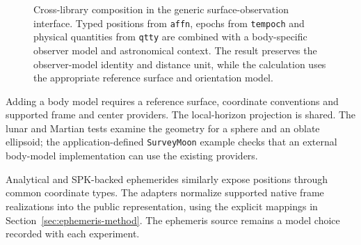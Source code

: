 \begin{figure}[!tbp]
    \centering
    
    \caption{Cross-library composition in the generic
        surface-observation interface. Typed positions from
        \texttt{affn}, epochs from \texttt{tempoch} and physical
        quantities from \texttt{qtty} are combined with a
        body-specific observer model and astronomical context.
        The result preserves the observer-model identity and
        distance unit, while the calculation uses the appropriate
        reference surface and orientation model.}
    \label{fig:architecture}
\end{figure}

Adding a body model requires a reference surface, coordinate conventions and supported frame and
center providers. The local-horizon projection is shared. The lunar and Martian tests examine the
geometry for a sphere and an oblate ellipsoid; the application-defined \texttt{SurveyMoon} example
checks that an external body-model implementation can use the existing providers.

Analytical and SPK-backed ephemerides similarly expose positions through common coordinate types.
The adapters normalize supported native frame realizations into the public representation, using
the explicit mappings in Section~\ref{sec:ephemeris-method}. The ephemeris source remains a model
choice recorded with each experiment.
